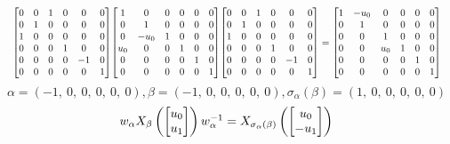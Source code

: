 \documentclass[11pt]{article}
\theoremstyle{definition}
\begin{document}
\[
\scaletoalign{\textwidth}{{\left[\begin{matrix}0 & 0 & 1 & 0 & 0 & 0\\0 & 1 & 0 & 0 & 0 & 0\\1 & 0 & 0 & 0 & 0 & 0\\0 & 0 & 0 & 1 & 0 & 0\\0 & 0 & 0 & 0 & -1 & 0\\0 & 0 & 0 & 0 & 0 & 1\end{matrix}\right]} {\left[\begin{matrix}1 & 0 & 0 & 0 & 0 & 0\\0 & 1 & 0 & 0 & 0 & 0\\0 & - u_{0} & 1 & 0 & 0 & 0\\u_{0} & 0 & 0 & 1 & 0 & 0\\0 & 0 & 0 & 0 & 1 & 0\\0 & 0 & 0 & 0 & 0 & 1\end{matrix}\right]} {\left[\begin{matrix}0 & 0 & 1 & 0 & 0 & 0\\0 & 1 & 0 & 0 & 0 & 0\\1 & 0 & 0 & 0 & 0 & 0\\0 & 0 & 0 & 1 & 0 & 0\\0 & 0 & 0 & 0 & -1 & 0\\0 & 0 & 0 & 0 & 0 & 1\end{matrix}\right]} = {\left[\begin{matrix}1 & - u_{0} & 0 & 0 & 0 & 0\\0 & 1 & 0 & 0 & 0 & 0\\0 & 0 & 1 & 0 & 0 & 0\\0 & 0 & u_{0} & 1 & 0 & 0\\0 & 0 & 0 & 0 & 1 & 0\\0 & 0 & 0 & 0 & 0 & 1\end{matrix}\right]}}
\]
\[
\alpha = \left( -1, \  0, \  0, \  0, \  0, \  0\right), \beta = \left( -1, \  0, \  0, \  0, \  0, \  0\right), \sigma_{\alpha}(\beta) = \left( 1, \  0, \  0, \  0, \  0, \  0\right)
\]
\[
\scaletoalign{\textwidth}{w_{\alpha} X_{\beta}\left(\left[\begin{matrix}u_{0}\\u_{1}\end{matrix}\right]\right) w_{\alpha}^{-1} = X_{\sigma_{\alpha}\left(\beta\right)}\left(\left[\begin{matrix}u_{0}\\- u_{1}\end{matrix}\right]\right)}
\]
\end{document}
